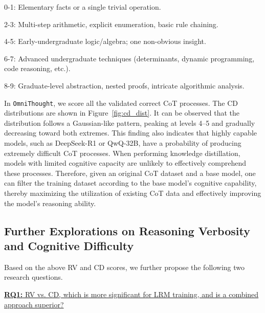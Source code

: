 \documentclass{article}
\begin{document}
\begin{footnotesize}
\begin{tcolorbox}[colback=green!5!white, colframe=green!50!black, title=Grading Criteria for Cognitive Difficulty]
0-1: Elementary facts or a single trivial operation.

2-3: Multi-step arithmetic, explicit enumeration, basic rule chaining.

4-5: Early-undergraduate logic/algebra; one non-obvious insight.

6-7: Advanced undergraduate techniques (determinants, dynamic programming, code reasoning, etc.).

8-9: Graduate-level abstraction, nested proofs, intricate algorithmic analysis.
\end{tcolorbox}
\end{footnotesize}






In \texttt{OmniThought}, we score all the validated correct CoT processes. The CD distributions are shown in Figure~\ref{fig:cd_dist}. It can be observed that the distribution follows a Gaussian-like pattern, peaking at levels 4–5 and gradually decreasing toward both extremes. This finding also indicates that highly capable models, such as DeepSeek-R1 or QwQ-32B, have a probability of producing extremely difficult CoT processes. When performing knowledge distillation, models with limited cognitive capacity are unlikely to effectively comprehend these processes. Therefore, given an original CoT dataset and a base model, one can filter the training dataset according to the base model’s cognitive capability, thereby maximizing the utilization of existing CoT data and effectively improving the model’s reasoning ability.




\subsection{Further Explorations on Reasoning Verbosity and Cognitive Difficulty}


Based on the above RV and CD scores, we further propose the following two research questions.

\underline{\textbf{RQ1:} RV vs. CD, which is more significant for LRM training, and is a combined approach superior?}
\end{document}
